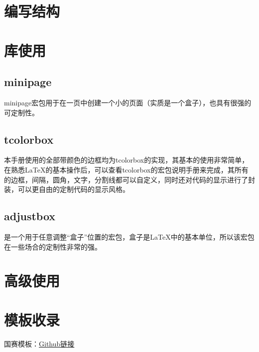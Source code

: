 \documentclass{article}
\begin{document}
    \section{编写结构}
    
    

    \section{库使用}
    \subsection{minipage}\label{sub:minipage}
    minipage宏包用于在一页中创建一个小的页面（实质是一个盒子），也具有很强的可定制性。
    \subsection{tcolorbox}
    本手册使用的全部带颜色的边框均为tcolorbox的实现，其基本的使用非常简单，在熟悉\LaTeX{}的基本操作后，可以查看tcolorbox的宏包说明手册来完成，其所有的边框，间隔，圆角，文字，分割线都可以自定义，同时还对代码的显示进行了封装，可以更自由的定制代码的显示风格。

    \subsection{adjustbox}
    是一个用于任意调整“盒子”位置的宏包，盒子是\LaTeX{}中的基本单位，所以该宏包在一些场合的定制性非常的强。
    
    \section{高级使用}

    \section{模板收录}
    国赛模板：\href{https://github.com/latexstudio/CUMCMThesis}{Github链接}
    
\end{document}
